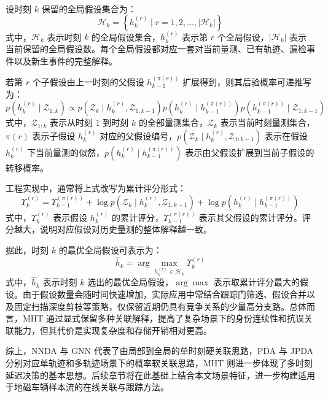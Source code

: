 \documentclass{xdupgthesis}
\begin{document}
设时刻 $k$ 保留的全局假设集合为：
\begin{equation}
	\mathcal{H}_k
	=
	\left\{
	h_k^{(r)} \mid r=1,2,\ldots,|\mathcal{H}_k|
	\right\}
\end{equation}
式中，$\mathcal{H}_k$ 表示时刻 $k$ 的全局假设集合，$h_k^{(r)}$ 表示第 $r$ 个全局假设，$|\mathcal{H}_k|$ 表示当前保留的全局假设数。每个全局假设都对应一套对当前量测、已有轨迹、漏检事件以及新生事件的完整解释。

若第 $r$ 个子假设由上一时刻的父假设 $h_{k-1}^{(\pi(r))}$ 扩展得到，则其后验概率可递推写为：
\begin{equation}
	p\!\left(
	h_k^{(r)}\mid\mathcal{Z}_{1:k}
	\right)
	\propto
	p\!\left(
	\mathcal{Z}_k\mid h_k^{(r)},\mathcal{Z}_{1:k-1}
	\right)
	p\!\left(
	h_k^{(r)}\mid h_{k-1}^{(\pi(r))}
	\right)
	p\!\left(
	h_{k-1}^{(\pi(r))}\mid\mathcal{Z}_{1:k-1}
	\right)
\end{equation}
式中，$\mathcal{Z}_{1:k}$ 表示从时刻 $1$ 到时刻 $k$ 的全部量测集合，$\mathcal{Z}_k$ 表示当前时刻量测集合，$\pi(r)$ 表示子假设 $h_k^{(r)}$ 对应的父假设编号，$p(\mathcal{Z}_k\mid h_k^{(r)},\mathcal{Z}_{1:k-1})$ 表示在假设 $h_k^{(r)}$ 下当前量测的似然，$p(h_k^{(r)}\mid h_{k-1}^{(\pi(r))})$ 表示由父假设扩展到当前子假设的转移概率。

工程实现中，通常将上式改写为累计评分形式：
\begin{equation}
	\Upsilon_k^{(r)}
	=
	\Upsilon_{k-1}^{(\pi(r))}
	+
	\log p\!\left(
	\mathcal{Z}_k\mid h_k^{(r)},\mathcal{Z}_{1:k-1}
	\right)
	+
	\log p\!\left(
	h_k^{(r)}\mid h_{k-1}^{(\pi(r))}
	\right)
\end{equation}
式中，$\Upsilon_k^{(r)}$ 表示假设 $h_k^{(r)}$ 的累计评分，$\Upsilon_{k-1}^{(\pi(r))}$ 表示其父假设的累计评分。评分越大，说明对应假设对历史量测的整体解释越一致。

据此，时刻 $k$ 的最优全局假设可表示为：
\begin{equation}
	\hat{h}_k
	=
	\arg\max_{h_k^{(r)}\in\mathcal{H}_k}
	\Upsilon_k^{(r)}
\end{equation}
式中，$\hat{h}_k$ 表示时刻 $k$ 选出的最优全局假设，$\arg\max$ 表示取累计评分最大的假设。由于假设数量会随时间快速增加，实际应用中常结合跟踪门筛选、假设合并以及固定扫描深度剪枝等策略，仅保留近期仍具有竞争关系的少量高分支路。总体而言，MHT 通过显式保留多种关联解释，提高了复杂场景下的身份连续性和抗误关联能力，但其代价是实现复杂度和存储开销相对更高。

综上，NNDA 与 GNN 代表了由局部到全局的单时刻硬关联思路，PDA 与 JPDA 分别对应单轨迹和多轨迹场景下的概率软关联思路，MHT 则进一步体现了多时刻延迟决策的基本思想。后续章节将在此基础上结合本文场景特征，进一步构建适用于地磁车辆样本流的在线关联与跟踪方法。
\end{document}
